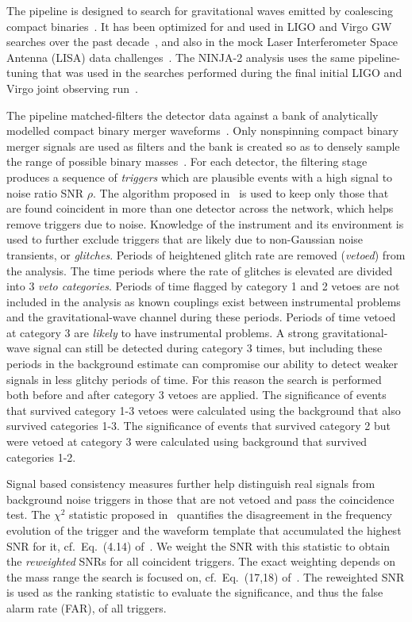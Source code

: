 The \ihope{} pipeline is designed to search for gravitational waves
emitted by coalescing compact binaries~\cite{Babak:2012zx}. It has been
optimized for and used in LIGO and Virgo GW searches over the past 
decade~\cite{Abbott:2007xi, Abbott:2009tt, Abbott:2009qj, Abadie:2010yb, 
Colaboration:2011np, Aasi:2012rja}, and also in the mock Laser 
Interferometer Space Antenna (LISA) data 
challenges~\cite{Babak:2008aa}. The NINJA-2 \ihope{} analysis uses the same 
pipeline-tuning that was used in the searches performed during 
the final initial LIGO and Virgo joint observing 
run~\cite{Colaboration:2011np}.

The pipeline matched-filters the detector data against a bank of
analytically modelled compact binary merger 
waveforms~\cite{Allen:2005fk,Babak:2012zx}. Only nonspinning compact binary 
merger signals are used as filters and the bank is created so as to densely 
sample the range of possible binary masses~\cite{Babak:2006ty}.
For each detector, the filtering stage produces 
a sequence of \textit{triggers} which are plausible events with a high 
signal to noise ratio SNR $\rho$. The algorithm proposed 
in~\cite{Robinson:2008un} is used to keep only those that are found coincident
in more than one detector across the network, which helps remove triggers due to 
noise. 
Knowledge of the instrument and its environment is used to further exclude
triggers that are likely due to non-Gaussian noise transients, or 
\textit{glitches}. Periods of heightened glitch rate are
removed (\emph{vetoed}) from the analysis. The time periods where the rate of 
glitches is elevated are divided into $3$ \emph{veto categories}. Periods of 
time flagged by category 1 and 2 vetoes are
not included in the analysis as known couplings exist between instrumental
problems and the gravitational-wave channel during these periods. Periods of
time vetoed at category 3 are \emph{likely} to have instrumental problems. A
strong gravitational-wave signal can still be detected during category 3 times,
but including these periods in the background estimate can compromise our
ability to detect weaker signals in less glitchy periods of time. For this
reason the search is performed both before and after category 3 vetoes are 
applied. The significance of events
that survived category 1-3 vetoes were calculated using the background that also
survived categories 1-3. The significance of events that survived category 2
but were vetoed at category 3 were calculated using background that survived
categories 1-2.

Signal based 
consistency measures further help distinguish real signals from background noise
triggers in those that are not vetoed and pass the coincidence test. 
The $\chi^{2}$ statistic proposed in~\cite{Allen:2004gu} quantifies the 
disagreement in the frequency evolution of 
the trigger and the waveform template that accumulated the highest SNR
for it, cf.\ Eq.~(4.14) of~\cite{Allen:2004gu}. We weight the SNR with this
statistic to obtain the \textit{reweighted} SNRs for all coincident triggers. 
The exact weighting depends on the mass range the search is focused on, cf.\
Eq.~(17,18) of~\cite{Babak:2012zx}. The reweighted SNR is used as the
ranking statistic to evaluate the significance, and thus the false alarm rate 
(FAR), of all triggers. 

